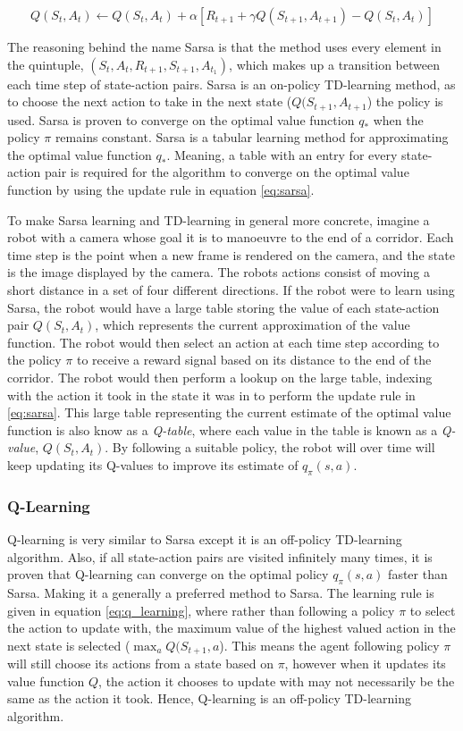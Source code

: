 \documentclass[../dissertation.tex]{subfiles}
\begin{document}
\begin{equation}
Q(S_t, A_t) \leftarrow Q(S_t, A_t) + \alpha[R_{t+1} + \gamma Q(S_{t+1}, A_{t+1}) - Q(S_t, A_t)]
\label{eq:sarsa}
\end{equation}

The reasoning behind the name Sarsa is that the method uses every element in the quintuple, $(S_t, A_t, R_{t+1}, S_{t+1}, A_{t_1})$, which makes up a transition between each time step of state-action pairs. Sarsa is an on-policy TD-learning method, as to choose the next action to take in the next state ($Q(S_{t+1}, A_{t+1}$) the policy is used. Sarsa is proven to converge on the optimal value function $q_*$ when the policy $\pi$ remains constant. Sarsa is a tabular learning method for approximating the optimal value function $q_*$. Meaning, a table with an entry for every state-action pair is required for the algorithm to converge on the optimal value function by using the update rule in equation \ref{eq:sarsa}.

To make Sarsa learning and TD-learning in general more concrete, imagine a robot with a camera whose goal it is to manoeuvre to the end of a corridor. Each time step is the point when a new frame is rendered on the camera, and the state is the image displayed by the camera. The robots actions consist of moving a short distance in a set of four different directions. If the robot were to learn using Sarsa, the robot would have a large table storing the value of each state-action pair $Q(S_t, A_t)$, which represents the current approximation of the value function. The robot would then select an action at each time step according to the policy $\pi$ to receive a reward signal based on its distance to the end of the corridor. The robot would then perform a lookup on the large table, indexing with the action it took in the state it was in to perform the update rule in \ref{eq:sarsa}. This large table representing the current estimate of the optimal value function is also know as a \textit{Q-table}, where each value in the table is known as a \textit{Q-value}, $Q(S_t, A_t)$. By following a suitable policy, the robot will over time will keep updating its Q-values to improve
its estimate of $q_\pi(s,a)$.

\subsubsection{Q-Learning}

Q-learning is very similar to Sarsa except it is an off-policy TD-learning algorithm. Also, if all state-action pairs are visited infinitely many times, it is proven that Q-learning can converge on the optimal policy $q_\pi(s,a)$ faster than Sarsa. Making it a generally a preferred method to Sarsa. The learning rule is given in equation \ref{eq:q_learning}, where rather than following a policy $\pi$ to select the action to update with, the maximum value of the highest valued action in the next state is selected ($\max_a Q(S_{t+1}, a$). This means the agent following policy $\pi$ will still choose its actions from a state based on $\pi$, however when it updates its value function $Q$, the action it chooses to update with may not necessarily be the same as the action it took. Hence, Q-learning is an off-policy TD-learning algorithm.
\end{document}
